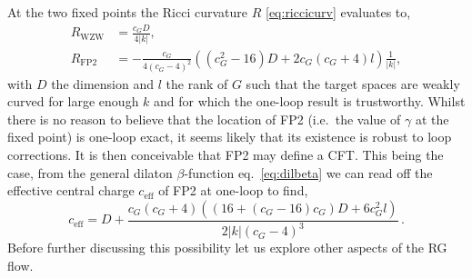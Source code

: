 \documentclass[12pt]{article}
\begin{document}

At the two fixed points  the Ricci curvature $R$ \eqref{eq:riccicurv} evaluates to,
\begin{align}
R_{\text{WZW}} &= \frac{c_G D}{4|k|}, \nonumber\\
R_{\text{FP2}} &= - \frac{c_G }{4 (c_G -4)^2}\left(\left(c_G^2 - 16 \right) D + 2 c_G \left( c_G +4 \right) l \right)       \frac{1}{|k|},\nonumber
\end{align}
with $D$ the dimension and $l$ the rank of $G$ such that the target spaces are weakly curved for large enough $k$ and for which the one-loop result is trustworthy.   Whilst there is no reason to believe that the location of FP2 (i.e.\ the value of $\gamma$ at the fixed point) is one-loop exact, it seems likely that its existence is robust to loop corrections.  It is then conceivable that FP2 may define a CFT.  This being the case, from the general dilaton $\beta$-function eq.~\eqref{eq:dilbeta} we can read off the effective central charge $c_\text{eff} $ of FP2 at one-loop  to find,
\begin{equation}
c_\text{eff} = D + \frac{c_G (c_G +4) \left( (16 + (c_G -16)c_G)D + 6 c_G^{2} l \right)}{2 |k| (c_G - 4)^{3}}\,.
\end{equation}
Before further discussing this possibility let us explore other aspects of the RG flow. 
\end{document}
